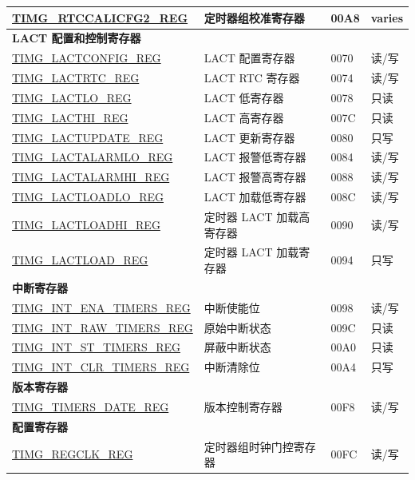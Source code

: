 \begin{longtable}{ | p{6cm} | p{7.2cm} | p{1.3cm} | p{1cm} | }
\hyperref[regdesc:TIMGRTCCALICFG2REG]{TIMG\_RTCCALICFG2\_REG} & 定时器组校准寄存器 & \hexprefix{}00A8 & varies \\ \hline
\multicolumn{4}{|l|}{\textbf{LACT 配置和控制寄存器}} \\ \hline
\hyperref[regdesc:TIMGLACTCONFIGREG]{TIMG\_LACTCONFIG\_REG} & LACT 配置寄存器 & \hexprefix{}0070 & 读/写 \\ \hline
\hyperref[regdesc:TIMGLACTRTCREG]{TIMG\_LACTRTC\_REG} & LACT RTC 寄存器 & \hexprefix{}0074 & 读/写 \\ \hline
\hyperref[regdesc:TIMGLACTLOREG]{TIMG\_LACTLO\_REG} & LACT 低寄存器 & \hexprefix{}0078 & 只读 \\ \hline
\hyperref[regdesc:TIMGLACTHIREG]{TIMG\_LACTHI\_REG} & LACT 高寄存器 & \hexprefix{}007C & 只读 \\ \hline
\hyperref[regdesc:TIMGLACTUPDATEREG]{TIMG\_LACTUPDATE\_REG} & LACT 更新寄存器 & \hexprefix{}0080 & 只写 \\ \hline
\hyperref[regdesc:TIMGLACTALARMLOREG]{TIMG\_LACTALARMLO\_REG} & LACT 报警低寄存器 & \hexprefix{}0084 & 读/写 \\ \hline
\hyperref[regdesc:TIMGLACTALARMHIREG]{TIMG\_LACTALARMHI\_REG} & LACT 报警高寄存器 & \hexprefix{}0088 & 读/写 \\ \hline
\hyperref[regdesc:TIMGLACTLOADLOREG]{TIMG\_LACTLOADLO\_REG} & LACT 加载低寄存器 & \hexprefix{}008C & 读/写 \\ \hline
\hyperref[regdesc:TIMGLACTLOADHIREG]{TIMG\_LACTLOADHI\_REG} & 定时器 LACT 加载高寄存器 & \hexprefix{}0090 & 读/写 \\ \hline
\hyperref[regdesc:TIMGLACTLOADREG]{TIMG\_LACTLOAD\_REG} & 定时器 LACT 加载寄存器 & \hexprefix{}0094 & 只写 \\ \hline
\multicolumn{4}{|l|}{\textbf{中断寄存器}} \\ \hline
\hyperref[regdesc:TIMGINTENATIMERSREG]{TIMG\_INT\_ENA\_TIMERS\_REG} & 中断使能位 & \hexprefix{}0098 & 读/写 \\ \hline
\hyperref[regdesc:TIMGINTRAWTIMERSREG]{TIMG\_INT\_RAW\_TIMERS\_REG} & 原始中断状态 & \hexprefix{}009C & 只读 \\ \hline
\hyperref[regdesc:TIMGINTSTTIMERSREG]{TIMG\_INT\_ST\_TIMERS\_REG} & 屏蔽中断状态 & \hexprefix{}00A0 & 只读 \\ \hline
\hyperref[regdesc:TIMGINTCLRTIMERSREG]{TIMG\_INT\_CLR\_TIMERS\_REG} & 中断清除位 & \hexprefix{}00A4 & 只写 \\ \hline
\multicolumn{4}{|l|}{\textbf{版本寄存器}} \\ \hline
\hyperref[regdesc:TIMGTIMERSDATEREG]{TIMG\_TIMERS\_DATE\_REG} & 版本控制寄存器 & \hexprefix{}00F8 & 读/写 \\ \hline
\multicolumn{4}{|l|}{\textbf{配置寄存器}} \\ \hline
\hyperref[regdesc:TIMGREGCLKREG]{TIMG\_REGCLK\_REG} & 定时器组时钟门控寄存器 & \hexprefix{}00FC & 读/写 \\ \hline
\end{longtable}
